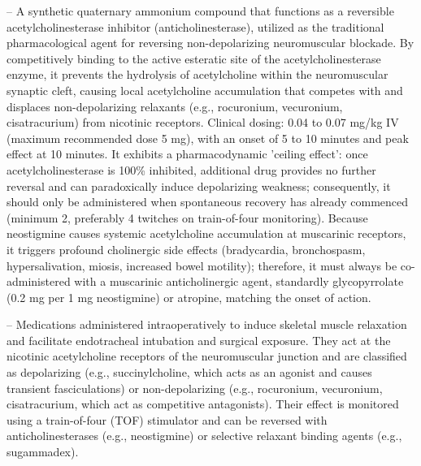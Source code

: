 -- A synthetic quaternary ammonium compound that functions as a reversible acetylcholinesterase inhibitor (anticholinesterase), utilized as the traditional pharmacological agent for reversing non-depolarizing neuromuscular blockade. By competitively binding to the active esteratic site of the acetylcholinesterase enzyme, it prevents the hydrolysis of acetylcholine within the neuromuscular synaptic cleft, causing local acetylcholine accumulation that competes with and displaces non-depolarizing relaxants (e.g., rocuronium, vecuronium, cisatracurium) from nicotinic receptors. Clinical dosing: 0.04 to 0.07 mg/kg IV (maximum recommended dose 5 mg), with an onset of 5 to 10 minutes and peak effect at 10 minutes. It exhibits a pharmacodynamic 'ceiling effect': once acetylcholinesterase is 100\% inhibited, additional drug provides no further reversal and can paradoxically induce depolarizing weakness; consequently, it should only be administered when spontaneous recovery has already commenced (minimum 2, preferably 4 twitches on train-of-four monitoring). Because neostigmine causes systemic acetylcholine accumulation at muscarinic receptors, it triggers profound cholinergic side effects (bradycardia, bronchospasm, hypersalivation, miosis, increased bowel motility); therefore, it must always be co-administered with a muscarinic anticholinergic agent, standardly glycopyrrolate (0.2 mg per 1 mg neostigmine) or atropine, matching the onset of action.

-- Medications administered intraoperatively to induce skeletal muscle relaxation and facilitate endotracheal intubation and surgical exposure. They act at the nicotinic acetylcholine receptors of the neuromuscular junction and are classified as depolarizing (e.g., succinylcholine, which acts as an agonist and causes transient fasciculations) or non-depolarizing (e.g., rocuronium, vecuronium, cisatracurium, which act as competitive antagonists). Their effect is monitored using a train-of-four (TOF) stimulator and can be reversed with anticholinesterases (e.g., neostigmine) or selective relaxant binding agents (e.g., sugammadex).

